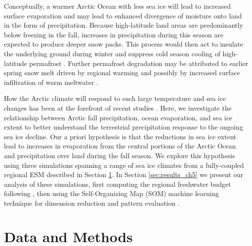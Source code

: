\documentclass[draft,linenumbers]{agujournal}
\begin{document}
Conceptually, a warmer Arctic Ocean with less sea ice will lead to increased surface evaporation and may lead to enhanced divergence of moisture onto land in the form of precipitation.
Because high-latitude land areas are predominantly below freezing in the fall, increases in precipitation during this season are expected to produce deeper snow packs.
This process would then act to insulate the underlying ground during winter and suppress cold season cooling of high-latitude permafrost \citep{Osterkamp_1999,Zhang_2005,Lawrence_2010}.
Further permafrost degradation may be attributed to earlier spring snow melt driven by regional warming and possibly by increased surface infiltration of warm meltwater \citep{Lawrence_2010}.

How the Arctic climate will respond to such large temperature and sea ice changes has been at the forefront of recent studies \citep[e.g.][]{Kazutoshi_2014,Simmonds_2014,Wegmann_2015,Vihma_2014}.
Here, we investigate the relationship between Arctic fall precipitation, ocean evaporation, and sea ice extent to better understand the terrestrial precipitation response to the ongoing sea ice decline.
Our a priori hypothesis is that the reductions in sea ice extent lead to increases in evaporation from the central portions of the Arctic Ocean and precipitation over land during the fall season.
We explore this hypothesis using three simulations spanning a range of sea ice climates from a fully-coupled regional ESM described in Section \ref{sec:data_models_ch5}.
In Section \ref{sec:results_ch5} we present our analysis of these simulations, first computing the regional freshwater budget following \citet{Serreze_2006a}, then using the Self-Organizing Map (SOM) machine learning technique for dimension reduction and pattern evaluation \citep{Kohonen_1998,Hewitson_2002}.

\section{Data and Methods}
\label{sec:data_models_ch5}
\end{document}
